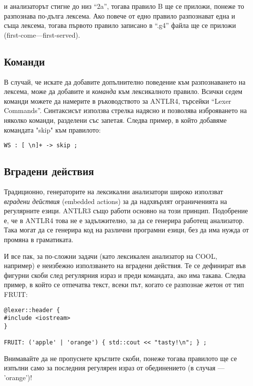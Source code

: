 \documentclass[11pt]{article}
\begin{document}
\noindent и анализаторът стигне до низ ``2a'', тогава правило B ще се приложи, понеже то разпознава по-дълга лексема.
Ако повече от едно правило разпознават една и съща лексема, тогава първото правило записано в ``.g4'' файла ще се приложи (first-come---first-served).

\subsection{Команди}

В случай, че искате да добавите допълнително поведение към разпознаването на лексема, може да добавите и \emph{команда} към лексикалното правило.
Всички седем команди можете да намерите в ръководството за ANTLR4, търсейки ``Lexer Commands''.
Синтаксисът използва стрелка надясно и позволява изброяването на няколко команди, разделени със запетая.
Следва пример, в който добавяме командата "skip" към правилото:

\begin{verbatim}
WS : [ \n]+ -> skip ;
\end{verbatim}

\subsection{Вградени действия}

Традиционно, генераторите на лексикални анализатори широко използват \emph{вградени действия} (embedded actions) за да надхвърлят ограниченията на регулярните езици.
ANTLR3 също работи основно на този принцип.
Подобрение е, че в ANTLR4 това не е задължително, за да се генерира работещ анализатор.
Така могат да се генерира код на различни програмни езици, без да има нужда от промяна в граматиката.

И все пак, за по-сложни задачи (като лексикален анализатор на COOL, например) е неизбежно използването на вградени действия.
Те се дефинират във фигурни скоби след регулярния израз и преди командата, ако има такава.
Следва пример, в който се отпечатва текст, всеки път, когато се разпознае жетон от тип FRUIT:

\begin{verbatim}
@lexer::header {
#include <iostream>
}

FRUIT: ('apple' | 'orange') { std::cout << "tasty!\n"; } ;
\end{verbatim}

\noindent Внимавайте да не пропуснете кръглите скоби, понеже тогава правилото ще се изпълни само за последния регулярен израз от обединението (в случая --- 'orange')!
\end{document}

